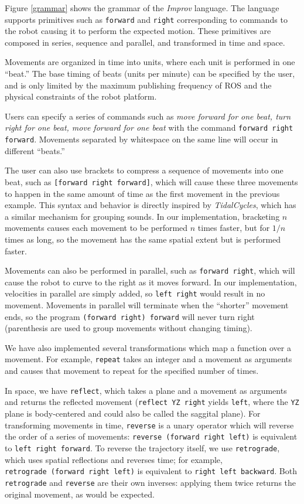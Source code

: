 \documentclass[sigconf]{acmart}
\begin{document}
Figure \ref{grammar} shows the grammar of the \emph{Improv} language.
The language supports primitives such as \texttt{forward} and \texttt{right}
corresponding to commands to the robot causing it to perform the expected
motion. These primitives are composed in series, sequence and parallel, and
transformed in time and space.

Movements are organized in time into units, where each unit is performed in one
``beat.'' The base timing of beats (units per minute) can be specified by the
user, and is only limited by the maximum publishing frequency of ROS and the
physical constraints of the robot platform.

Users can specify a series of commands such as \emph{move forward for
one beat, turn right for one beat, move forward for one beat} with the
command \texttt{forward right forward}. Movements separated by whitespace 
on the same line will occur in different ``beats.''

The user can also use brackets to compress a sequence of movements into
one beat, such as \texttt{[forward right forward]}, which will
cause these three movements to happen in the same amount of time as the
first movement in the previous example. This syntax and behavior is directly 
inspired by \emph{TidalCycles}, which has a similar mechanism for grouping
sounds. In our implementation,
bracketing $n$ movements causes each movement to be performed $n$
times faster, but for $1/n$ times as long, so the movement has the
same spatial extent but is performed faster.

Movements can also be performed in parallel, such as
\texttt{forward \textbar{}\textbar{} right}, which will cause the
robot to curve to the right as it moves forward. In our implementation,
velocities in parallel are simply added, so
\texttt{left \textbar{}\textbar{} right} would result in no
movement. Movements in parallel will terminate
when the ``shorter'' movement ends, so the program
\texttt{(forward right) \textbar{}\textbar{} forward} will never turn
right (parenthesis are used to group movements without changing timing).

We have also implemented several transformations which map a function
over a movement. For example, \texttt{repeat} takes an integer and a
movement as arguments and causes that movement to repeat for the
specified number of times.

In space, we have \texttt{reflect}, which takes a plane and a movement
as arguments and returns the reflected movement
(\texttt{reflect\ YZ\ right} yields \texttt{left}, where the \texttt{YZ}
plane is body-centered and could also be called the saggital plane). For transforming movements in time, \texttt{reverse} is a
unary operator which will reverse the order of a series of movements:
\texttt{reverse\ (forward\ right\ left)} is equivalent to
\texttt{left\ right\ forward}. To reverse the trajectory itself, we use
\texttt{retrograde}, which uses spatial reflections and reverses time;
for example, \texttt{retrograde\ (forward\ right\ left)} is equivalent
to \texttt{right\ left\ backward}. Both \texttt{retrograde} and
\texttt{reverse} are their own inverses: applying them twice returns the
original movement, as would be expected.
\end{document}
